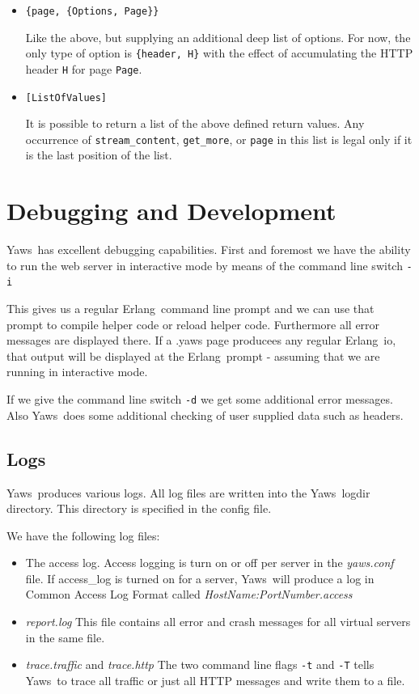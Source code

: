 \documentclass[11pt,oneside,english]{book}
\newcommand{\Erlang}            %
        {{\sc Erlang}}
\newcommand{\Yaws}            %
        {{\sc Yaws}}
\begin{document}
\begin{itemize}
\item       \verb+{page, {Options, Page}}+

              Like the above, but supplying an additional deep list of
              options.  For now, the only type of option is
              \verb+{header, H}+ with the effect of accumulating the
              HTTP header \verb+H+ for page \verb+Page+.

\item       \verb+[ListOfValues]+

              It is possible to return a list of the above defined
              return values.  Any occurrence of \verb+stream_content+,
              \verb+get_more+, or \verb+page+ in this list is legal
              only if it is the last position of the list.

\end{itemize}



\chapter{Debugging and Development}

\Yaws\  has excellent debugging capabilities. First and foremost we
have the ability to run the web server in interactive mode by means of
the command line switch \verb+-i+

This gives us a regular \Erlang\  command line prompt and we can
use that prompt to compile helper code or reload helper
code. Furthermore all error messages are displayed there.
If a .yaws page producees any regular \Erlang\ io, that output will
be displayed at the \Erlang\ prompt - assuming that we are running in interactive mode.

If we give the command line switch \verb+-d+ we get some
additional error messages. Also \Yaws\  does some additional checking
of user supplied data such as headers.

\section{Logs}
\Yaws\  produces various logs. All log files are written into the
\Yaws\  logdir directory. This directory is specified in the config file.

We have the following log files:
\begin{itemize}
\item The access log. Access logging is turn on or off per server
in the \textit{yaws.conf} file. If access\_log is turned on for a server,
\Yaws\  will produce a log in Common Access Log Format called
\textit{HostName:PortNumber.access}

\item \textit{report.log} This file contains all error and crash
messages for all virtual servers in the same file.

\item \textit{trace.traffic} and \textit{trace.http} The two
command line flags \verb+-t+ and \verb+-T+ tells \Yaws\  to trace
all traffic or just all HTTP messages and write them to a file.
\end{itemize}
\end{document}
